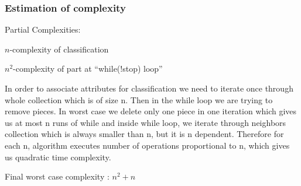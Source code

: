 \subsubsection{Estimation of complexity}
Partial Complexities:

$n$-complexity of classification

$n^2$-complexity of part at “while(!stop) loop”

In order to associate attributes for classification we need to iterate once through whole collection
which is of size n. Then in the while loop we are trying to remove pieces. In worst case we delete
only one piece in one iteration which gives us at most n runs of while and inside while loop, we
iterate through neighbors collection which is always smaller than n, but it is n dependent.
Therefore for each n, algorithm executes number of operations proportional to n, which gives us
quadratic time complexity.

Final worst case complexity : $n^2 + n$
